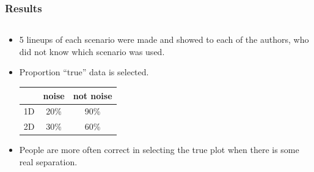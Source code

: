 \documentclass{beamer}
\begin{document}
\begin{frame}
  \frametitle{Results}
	\begin{columns}
		\begin{column}{0.45\textwidth}
		  \begin{itemize}
			  \item 5 lineups of each scenario were made and showed to each of the authors, who did not know which scenario was used.
		\item Proportion ``true'' data is selected.
		\begin{table}[ht]
		\begin{center}
		\begin{tabular}{c|cc}
  		\hline
 		& noise & not noise\\
 	 	\hline
		1D &  20\% & 90\% \\ 
		2D &  30\% & 60\% \\
   		\hline
		\end{tabular}
		\end{center}
		\end{table}
	
			 \item People are more often correct in selecting the true plot when there is some real separation.
		  \end{itemize}		
			
		\end{column}
		

\end{columns}
\end{frame}
\end{document}
